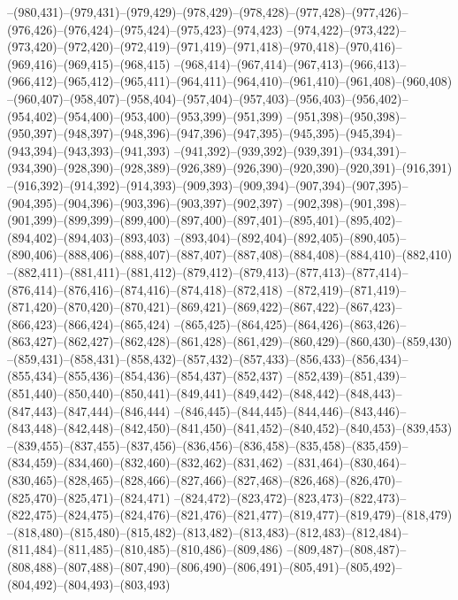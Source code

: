 --(980,431)--(979,431)--(979,429)--(978,429)--(978,428)--(977,428)--(977,426)--(976,426)--(976,424)--(975,424)--(975,423)--(974,423)
--(974,422)--(973,422)--(973,420)--(972,420)--(972,419)--(971,419)--(971,418)--(970,418)--(970,416)--(969,416)--(969,415)--(968,415)
--(968,414)--(967,414)--(967,413)--(966,413)--(966,412)--(965,412)--(965,411)--(964,411)--(964,410)--(961,410)--(961,408)--(960,408)
--(960,407)--(958,407)--(958,404)--(957,404)--(957,403)--(956,403)--(956,402)--(954,402)--(954,400)--(953,400)--(953,399)--(951,399)
--(951,398)--(950,398)--(950,397)--(948,397)--(948,396)--(947,396)--(947,395)--(945,395)--(945,394)--(943,394)--(943,393)--(941,393)
--(941,392)--(939,392)--(939,391)--(934,391)--(934,390)--(928,390)--(928,389)--(926,389)--(926,390)--(920,390)--(920,391)--(916,391)
--(916,392)--(914,392)--(914,393)--(909,393)--(909,394)--(907,394)--(907,395)--(904,395)--(904,396)--(903,396)--(903,397)--(902,397)
--(902,398)--(901,398)--(901,399)--(899,399)--(899,400)--(897,400)--(897,401)--(895,401)--(895,402)--(894,402)--(894,403)--(893,403)
--(893,404)--(892,404)--(892,405)--(890,405)--(890,406)--(888,406)--(888,407)--(887,407)--(887,408)--(884,408)--(884,410)--(882,410)
--(882,411)--(881,411)--(881,412)--(879,412)--(879,413)--(877,413)--(877,414)--(876,414)--(876,416)--(874,416)--(874,418)--(872,418)
--(872,419)--(871,419)--(871,420)--(870,420)--(870,421)--(869,421)--(869,422)--(867,422)--(867,423)--(866,423)--(866,424)--(865,424)
--(865,425)--(864,425)--(864,426)--(863,426)--(863,427)--(862,427)--(862,428)--(861,428)--(861,429)--(860,429)--(860,430)--(859,430)
--(859,431)--(858,431)--(858,432)--(857,432)--(857,433)--(856,433)--(856,434)--(855,434)--(855,436)--(854,436)--(854,437)--(852,437)
--(852,439)--(851,439)--(851,440)--(850,440)--(850,441)--(849,441)--(849,442)--(848,442)--(848,443)--(847,443)--(847,444)--(846,444)
--(846,445)--(844,445)--(844,446)--(843,446)--(843,448)--(842,448)--(842,450)--(841,450)--(841,452)--(840,452)--(840,453)--(839,453)
--(839,455)--(837,455)--(837,456)--(836,456)--(836,458)--(835,458)--(835,459)--(834,459)--(834,460)--(832,460)--(832,462)--(831,462)
--(831,464)--(830,464)--(830,465)--(828,465)--(828,466)--(827,466)--(827,468)--(826,468)--(826,470)--(825,470)--(825,471)--(824,471)
--(824,472)--(823,472)--(823,473)--(822,473)--(822,475)--(824,475)--(824,476)--(821,476)--(821,477)--(819,477)--(819,479)--(818,479)
--(818,480)--(815,480)--(815,482)--(813,482)--(813,483)--(812,483)--(812,484)--(811,484)--(811,485)--(810,485)--(810,486)--(809,486)
--(809,487)--(808,487)--(808,488)--(807,488)--(807,490)--(806,490)--(806,491)--(805,491)--(805,492)--(804,492)--(804,493)--(803,493)
